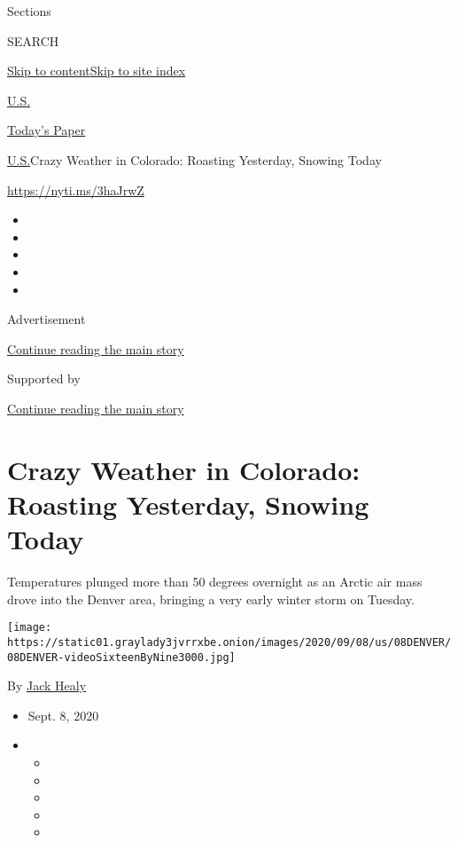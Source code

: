 Sections

SEARCH

\protect\hyperlink{site-content}{Skip to
content}\protect\hyperlink{site-index}{Skip to site index}

\href{https://www.nytimes3xbfgragh.onion/section/us}{U.S.}

\href{https://myaccount.nytimes3xbfgragh.onion/auth/login?response_type=cookie\&client_id=vi}{}

\href{https://www.nytimes3xbfgragh.onion/section/todayspaper}{Today's
Paper}

\href{/section/us}{U.S.}\textbar{}Crazy Weather in Colorado: Roasting
Yesterday, Snowing Today

\url{https://nyti.ms/3haJrwZ}

\begin{itemize}
\item
\item
\item
\item
\item
\end{itemize}

Advertisement

\protect\hyperlink{after-top}{Continue reading the main story}

Supported by

\protect\hyperlink{after-sponsor}{Continue reading the main story}

\hypertarget{crazy-weather-in-colorado-roasting-yesterday-snowing-today}{%
\section{Crazy Weather in Colorado: Roasting Yesterday, Snowing
Today}\label{crazy-weather-in-colorado-roasting-yesterday-snowing-today}}

Temperatures plunged more than 50 degrees overnight as an Arctic air
mass drove into the Denver area, bringing a very early winter storm on
Tuesday.

\texttt{[image: https://static01.graylady3jvrrxbe.onion/images/2020/09/08/us/08DENVER/08DENVER-videoSixteenByNine3000.jpg]}

By \href{https://www.nytimes3xbfgragh.onion/by/jack-healy}{Jack Healy}

\begin{itemize}
\item
  Sept. 8, 2020
\item
  \begin{itemize}
  \item
  \item
  \item
  \item
  \item
  \end{itemize}
\end{itemize}

